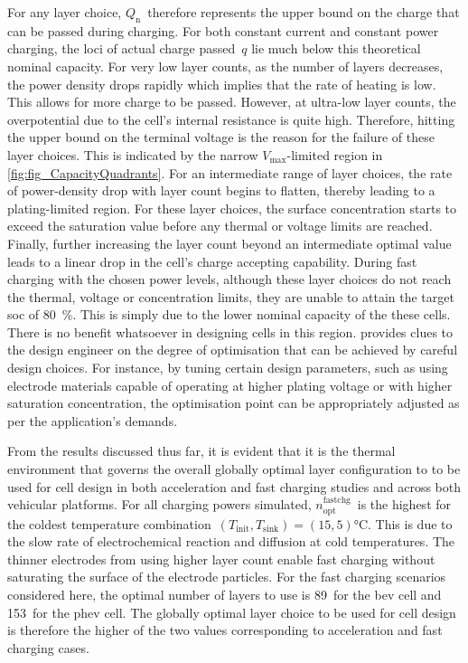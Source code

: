 For any layer  choice, $Q_\text{n}$~therefore represents the upper  bound on the
charge  that can  be  passed  during charging.  For  both  constant current  and
constant power  charging, the loci of  actual charge passed~$q$ lie  much below
this theoretical nominal  capacity. For very low layer counts,  as the number of
layers decreases, the power density drops rapidly which implies that the rate of
heating is low. This allows for more  charge to be passed. However, at ultra-low
layer counts, the  overpotential due to the cell's internal  resistance is quite
high.  Therefore,  hitting the  upper  bound  on  the  terminal voltage  is  the
reason  for  the failure  of  these  layer choices.  This  is  indicated by  the
narrow \mbox{$V_\text{max}$-limited} region in \cref{fig:fig_CapacityQuadrants}.
For an intermediate range of  layer choices, the rate of power-density  drop
with layer count begins to flatten, thereby leading  to a plating-limited
region. For these layer choices, the  surface concentration starts to exceed
the saturation value before any  thermal or voltage  limits are reached.
Finally,  further increasing the layer count beyond  an intermediate optimal
value leads to  a linear drop in the cell's  charge accepting  capability.
During fast  charging with  the chosen power levels, although these layer
choices  do not reach the thermal, voltage or concentration  limits,  they  are
unable  to attain  the  target  \gls{soc}  of \SI{80}{\percent}. This is simply
due to the lower nominal capacity of the these cells.  There is  no  benefit
whatsoever in  designing  cells  in this  region.
 provides  clues to  the design engineer  on the
degree  of optimisation  that can  be achieved  by careful  design choices.  For
instance, by tuning certain design parameters, such as using electrode materials
capable  of  operating at  higher  plating  voltage  or with  higher  saturation
concentration, the optimisation  point can be appropriately adjusted  as per the
application's demands.


From  the results  discussed thus  far, it  is evident  that it  is the  thermal
environment  that  governs   the  overall globally optimal  layer configuration
to to be used for cell design in  both acceleration and fast charging studies
and across both vehicular platforms. For all charging powers simulated,
$n^\text{fastchg}_\text{opt}$~is the highest for the coldest temperature
combination~${(T_\text{init},T_\text{sink}) =  (15, 5) \si{\degreeCelsius}}$.
This is due to  the slow rate of electrochemical reaction and diffusion  at cold
temperatures. The thinner  electrodes from  using higher layer count enable
fast charging without saturating the surface of the electrode particles. For the
fast charging scenarios considered here,  the optimal number of layers to use
is 89~for the \gls{bev} cell and  153~for the \gls{phev} cell. The globally
optimal  layer choice to be  used for cell design  is therefore the higher of
the two values corresponding  to acceleration and fast charging cases.

